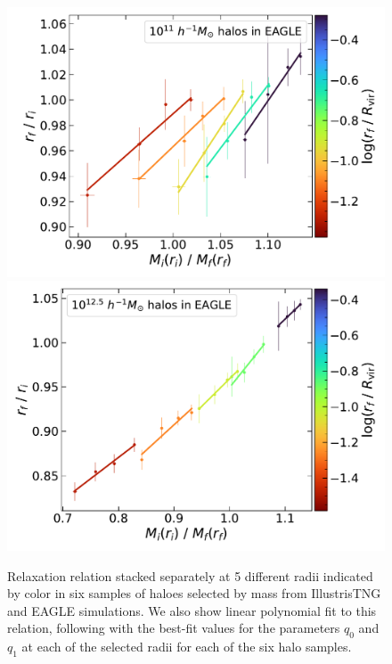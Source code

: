 \begin{figure}
    \includegraphics[width=0.48\linewidth]{plots/fit_show_rf_M_E25_M11.pdf}
    \includegraphics[width=0.48\linewidth]{plots/fit_show_rf_M_E100_M12.5.pdf}
    \caption{Relaxation relation stacked separately at 5 different radii indicated by color in six samples of haloes selected by mass from IllustrisTNG and EAGLE simulations. We also show linear polynomial fit to this relation, following  with the best-fit values for the parameters $q_0$ and $q_1$ at each of the selected radii for each of the six halo samples.} %
    \label{fig:rf-fit-show-ch:z0main}
\end{figure}

